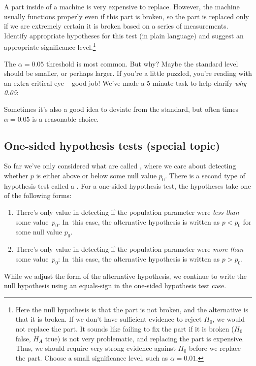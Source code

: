 \begin{exercise}
A part inside of a machine is very expensive to replace.
However, the machine usually functions properly even if
this part is broken, so the part is replaced only if we
are extremely certain it is broken based on a series of
measurements.
Identify appropriate hypotheses for this test
(in plain language) and suggest an appropriate significance
level.\footnote{Here
the null hypothesis is that the part is not broken,
and the alternative is that it is broken.
If we don't have sufficient evidence to reject $H_0$,
we would not replace the part.
It sounds like failing to fix the part if it is broken
($H_0$ false, $H_A$ true) is not very problematic,
and replacing the part is expensive.
Thus, we should require very strong evidence against
$H_0$ before we replace the part.
Choose a small significance level, such as $\alpha=0.01$.}
\end{exercise}

\begin{termBox}{
The $\alpha = 0.05$ threshold is most common. But why?
Maybe the standard level should be smaller, or perhaps larger.
If you're a little puzzled, you're reading with an
extra critical eye -- good job!
We've made a 5-minute task to help clarify \emph{why 0.05}:
\begin{center}
\end{center}
Sometimes it's also a good idea to deviate from the
standard, but often times $\alpha = 0.05$ is
a reasonable choice.}
\end{termBox}



\subsection{One-sided hypothesis tests (special topic)}

So far we've only considered what are called , where we care about detecting whether $p$
is either above or below some null value $p_0$.
There is a second type of hypothesis test called a
.
For a one-sided hypothesis test,
the hypotheses take one of the following forms:
\begin{enumerate}
\item There's only value in detecting if the population
    parameter were \emph{less than} some value~$p_0$.
    In~this case, the alternative hypothesis is written
    as $p < p_0$ for some null value $p_0$.
\item There's only value in detecting if the population
    parameter were \emph{more than} some value~$p_0$:
    In~this case, the alternative hypothesis is written
    as $p > p_0$.
\end{enumerate}
While we adjust the form of the alternative hypothesis,
we continue to write the null hypothesis using an equals-sign
in the one-sided hypothesis test case.

